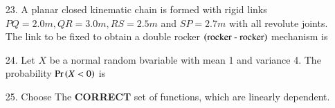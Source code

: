 \documentclass[journal,12pt,onecolumn]{IEEEtran}
\theoremstyle{remark}
\begin{document}
\begin{enumerate}
    \item[23.] A planar closed kinematic chain is formed with rigid links $PQ = 2.0m, QR = 3.0m, RS = 2.5m$ and
        $SP = 2.7m$ with all revolute joints. The link to be fixed to obtain a double rocker $\left(\textnormal{rocker - rocker}\right)$
        mechanism is
        \hfill{}
        \begin{enumerate}
        \end{enumerate}
    \item[24.] Let $X$ be a normal random bvariable with mean 1 and variance 4. The 
        probability $\Pr\left(X < 0\right)$ is 
        \hfill{}
        \begin{enumerate}
        \end{enumerate}

    \item[25.] Choose The \textbf{CORRECT} set of functions, which are linearly dependent. 
        \hfill{}

        \begin{enumerate}
\end{enumerate}
\end{enumerate}
\end{document}

